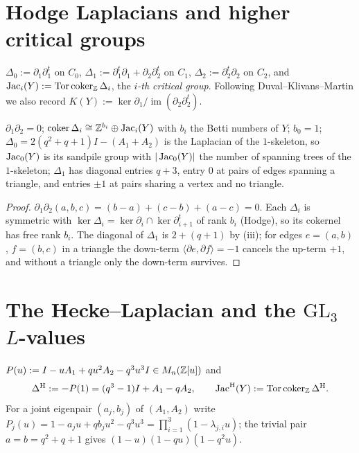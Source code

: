 \section{Hodge Laplacians and higher critical groups}\label{X:sec:hodge}

\begin{definition}\label{X:def:hodge}
$\Delta_0:=\partial_1\partial_1^{t}$ on $C_0$, $\Delta_1:=\partial_1^{t}\partial_1
+\partial_2\partial_2^{t}$ on $C_1$, $\Delta_2:=\partial_2^{t}\partial_2$ on $C_2$, and
$\operatorname{Jac}_i(Y):=\operatorname{Tor}\operatorname{coker}_{\mathbb{Z}}\Delta_i$, the \emph{$i$-th critical group}. Following
Duval--Klivans--Martin \cite{DKM} we also record $K(Y):=\ker\partial_1/\operatorname{im}
(\partial_2\partial_2^{t})$.
\end{definition}

\begin{proposition}[Structure]\label{X:prop:hodge}
$\partial_1\partial_2=0$; $\operatorname{coker}\Delta_i\cong\mathbb{Z}^{b_i}\oplus\operatorname{Jac}_i(Y)$ with $b_i$ the Betti
numbers of $Y$; $b_0=1$; $\Delta_0=2(q^{2}+q+1)I-(A_1+A_2)$ is the Laplacian of the
$1$-skeleton, so $\operatorname{Jac}_0(Y)$ is its sandpile group with $|\operatorname{Jac}_0(Y)|$ the number of
spanning trees of the $1$-skeleton; $\Delta_1$ has diagonal entries $q+3$, entry $0$ at pairs
of edges spanning a triangle, and entries $\pm1$ at pairs sharing a vertex and no triangle.
\end{proposition}

\begin{proof}
$\partial_1\partial_2(a,b,c)=(b-a)+(c-b)+(a-c)=0$. Each $\Delta_i$ is symmetric with
$\ker\Delta_i=\ker\partial_i\cap\ker\partial_{i+1}^{t}$ of rank $b_i$ (Hodge), so its
cokernel has free rank $b_i$. The diagonal of $\Delta_1$ is $2+(q+1)$ by (iii); for edges
$e=(a,b)$, $f=(b,c)$ in a triangle the down-term $\langle\partial e,\partial f\rangle=-1$
cancels the up-term $+1$, and without a triangle only the down-term survives.
\end{proof}

\section{The Hecke--Laplacian and the \texorpdfstring{$\mathrm{GL}_3$ $L$-values}{GL3 L-values}}\label{X:sec:hecke}

\begin{definition}\label{X:def:pencil}
$P(u):=I-uA_1+qu^{2}A_2-q^{3}u^{3}I\in M_n(\mathbb{Z}[u])$ and
\[
\Delta^{\mathrm{H}}:=-P(1)=(q^{3}-1)I+A_1-qA_2,\qquad \operatorname{Jac}^{\mathrm{H}}(Y):=\operatorname{Tor}\operatorname{coker}_{\mathbb{Z}}\Delta^{\mathrm{H}} .
\]
For a joint eigenpair $(a_j,b_j)$ of $(A_1,A_2)$ write $P_j(u)=1-a_ju+qb_ju^{2}-q^{3}u^{3}
=\prod_{i=1}^{3}(1-\lambda_{j,i}u)$; the trivial pair $a=b=q^{2}+q+1$ gives
$(1-u)(1-qu)(1-q^{2}u)$.
\end{definition}

